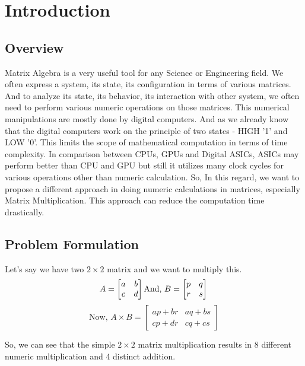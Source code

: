 \chapter{Introduction}

\section{Overview}
Matrix Algebra is a very useful tool for any Science or Engineering field. We often express a system, its state, its configuration in terms of various matrices. And to analyze its state, its behavior, its interaction with other system, we often need to perform various numeric operations on those matrices. This numerical manipulations are mostly done by digital computers. And as we already know that the digital computers work on the principle of two states - HIGH '1' and LOW '0'. This limits the scope of mathematical computation in terms of time complexity. In comparison between CPUs, GPUs and Digital ASICs, ASICs may perform better than CPU and GPU but still it utilizes many clock cycles for various operations other than numeric calculation. So, In this regard, we want to propose a different approach in doing numeric calculations in matrices, especially Matrix Multiplication. This approach can reduce the computation time drastically.


\section{Problem Formulation}
Let's say we have two $2\times2$ matrix and we want to multiply this.
\begin{displaymath}
	A = \begin{bmatrix}
		a & b\\
		c & d
	\end{bmatrix}
\text{And, }
	B = \begin{bmatrix}
		p & q\\
		r & s
	\end{bmatrix}\\
\end{displaymath}
\begin{displaymath}
	\text{Now, } A \times B = \begin{bmatrix}
		ap+br & aq+bs\\
		cp+dr & cq+cs
	\end{bmatrix}
\end{displaymath}

So, we can see that the simple $2\times2$ matrix multiplication results in 8 different numeric multiplication and 4 distinct addition.

